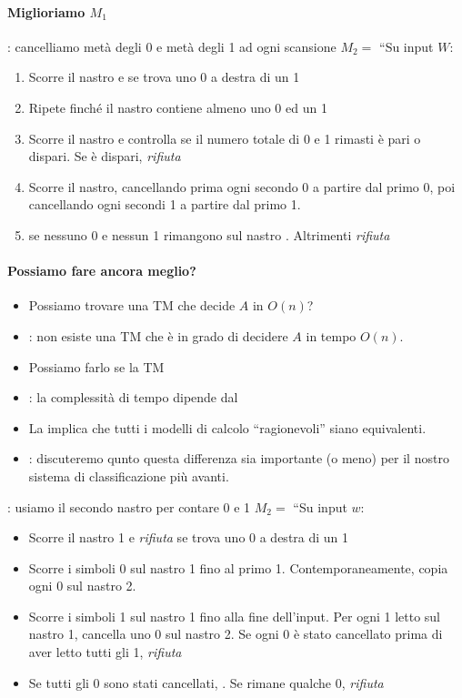 \paragraph{Miglioriamo $M_1$}: cancelliamo metà degli 0 e metà degli 1 ad
ogni scansione
$M_2=$ ``Su input $W$:
\begin{enumerate}
  \item Scorre il nastro e  se trova uno 0 a destra di un 1
  \item Ripete finché il nastro contiene almeno uno 0 ed un 1
  \item Scorre il nastro e controlla se il numero totale di 0 e 1 rimasti
    è pari o dispari. Se è dispari, \textit{rifiuta}
  \item Scorre il nastro, cancellando prima ogni secondo 0 a partire dal primo
    0, poi cancellando ogni secondi 1 a partire dal primo 1.
  \item se nessuno 0 e nessun 1 rimangono sul nastro . 
    Altrimenti \textit{rifiuta}
\end{enumerate}
\paragraph{Possiamo fare ancora meglio?}
\begin{itemize}
  \item Possiamo trovare una TM che decide $A$ in $O(n)$?
  \item {}: non esiste una TM  che è in grado di decidere 
    $A$ in tempo $O(n)$.
  \item Possiamo farlo se la TM 
  \item {}: la complessità di tempo dipende dal 
  \item La  implica che tutti i modelli di calcolo ``ragionevoli''
    siano equivalenti.
  \item {}: discuteremo qunto questa differenza sia importante (o meno) 
    per il nostro sistema di classificazione più avanti. 
\end{itemize}
: usiamo il secondo nastro per contare 0 e 1
$M_2 =$ ``Su input $w$:
\begin{itemize}
  \item Scorre il nastro 1 e \textit{rifiuta} se trova uno 0 a destra di un 1
  \item Scorre i simboli 0 sul nastro 1 fino al primo 1. 
    Contemporaneamente, copia ogni 0 sul nastro 2.
  \item Scorre i simboli 1 sul nastro 1 fino alla fine dell'input. 
    Per ogni 1 letto sul nastro 1, cancella uno 0 sul nastro 2.
    Se ogni 0 è stato cancellato prima di aver letto tutti gli 1, \textit{rifiuta}
  \item Se tutti gli 0 sono stati cancellati, . 
    Se rimane qualche 0, \textit{rifiuta}
\end{itemize}
